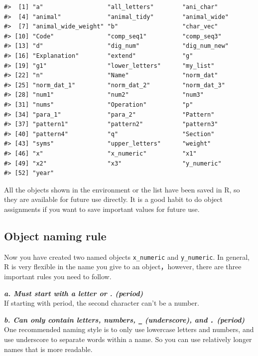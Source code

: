 \documentclass[
]{book}
\begin{document}
\begin{verbatim}
#>  [1] "a"                  "all_letters"        "ani_char"          
#>  [4] "animal"             "animal_tidy"        "animal_wide"       
#>  [7] "animal_wide_weight" "b"                  "char_vec"          
#> [10] "Code"               "comp_seq1"          "comp_seq3"         
#> [13] "d"                  "dig_num"            "dig_num_new"       
#> [16] "Explanation"        "extend"             "g"                 
#> [19] "g1"                 "lower_letters"      "my_list"           
#> [22] "n"                  "Name"               "norm_dat"          
#> [25] "norm_dat_1"         "norm_dat_2"         "norm_dat_3"        
#> [28] "num1"               "num2"               "num3"              
#> [31] "nums"               "Operation"          "p"                 
#> [34] "para_1"             "para_2"             "Pattern"           
#> [37] "pattern1"           "pattern2"           "pattern3"          
#> [40] "pattern4"           "q"                  "Section"           
#> [43] "syms"               "upper_letters"      "weight"            
#> [46] "x"                  "x_numeric"          "x1"                
#> [49] "x2"                 "x3"                 "y_numeric"         
#> [52] "year"
\end{verbatim}

All the objects shown in the environment or the list have been saved in R, so they are available for future use directly. It is a good habit to do object assignments if you want to save important values for future use.

\hypertarget{Naming}{%
\subsection{Object naming rule}\label{Naming}}

Now you have created two named objects \texttt{x\_numeric} and \texttt{y\_numeric}. In general, R is very flexible in the name you give to an object，however, there are three important rules you need to follow.

\textbf{\emph{a. Must start with a letter or . (period)}}\\
If starting with period, the second character can't be a number.

\textbf{\emph{b. Can only contain letters, numbers, \texttt{\_} (underscore), and \texttt{.} (period)}}
One recommended naming style is to only use lowercase letters and numbers, and use underscore to separate words within a name. So you can use relatively longer names that is more readable.
\end{document}

